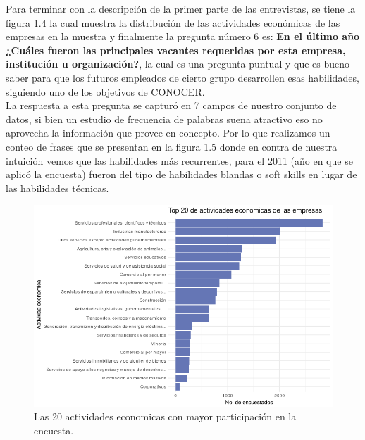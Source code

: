 \documentclass[paper=letter, fontsize=11pt]{scrartcl}
\numberwithin{equation}{section} %
\numberwithin{figure}{section} %
\numberwithin{table}{section} %
\begin{document}
Para terminar con la descripción de la primer parte de las entrevistas, se tiene la figura 1.4 la cual muestra la distribución de las actividades económicas de las empresas en la muestra y finalmente la pregunta número 6 es: 
\textbf{En el último año ¿Cuáles fueron las principales vacantes requeridas por esta empresa, institución u organización?}, la cual es una pregunta puntual y que es bueno saber para que los futuros empleados de cierto grupo desarrollen esas habilidades, siguiendo uno de los objetivos de CONOCER.\\

La respuesta a esta pregunta se capturó en 7 campos de nuestro conjunto de datos, si bien un estudio de frecuencia de palabras suena atractivo eso no aprovecha la información que provee en concepto. Por lo que realizamos un conteo de frases que se presentan en la figura 1.5 donde en contra de nuestra intuición vemos que las habilidades más recurrentes, para el 2011 (año en que se aplicó la encuesta) fueron del tipo de habilidades blandas o soft skills en lugar de las habilidades técnicas. 

\begin{figure}[H]
  \begin{center}
    \includegraphics[scale=.5]{20actecon.png}
    \caption{ Las 20 actividades economicas con mayor participación en la encuesta.}
    \label{figura1_3}
  \end{center}
\end{figure}
\end{document}
